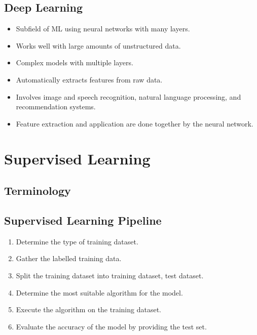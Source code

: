 \documentclass[12pt letter]{report}
\begin{document}
\subsection{Deep Learning}
\begin{itemize}
  \item Subfield of ML using neural networks with many layers.
  \item  Works well with large amounts of unstructured data.
  \item  Complex models with multiple layers.
  \item Automatically extracts features from raw data.
  \item Involves image and speech recognition, natural language processing, and recommendation systems.
  \item Feature extraction and application are done together by the neural network.
\end{itemize}

\section{Supervised Learning}


\subsection{Terminology}





\subsection{Supervised Learning Pipeline}

\begin{enumerate}
  \item Determine the type of training dataset.
  \item Gather the labelled training data.
  \item Split the training dataset into training dataset, test dataset.
  \item Determine the most suitable algorithm for the model.
  \item Execute the algorithm on the training dataset.
  \item Evaluate the accuracy of the model by providing the test set.
\end{enumerate}
\end{document}
